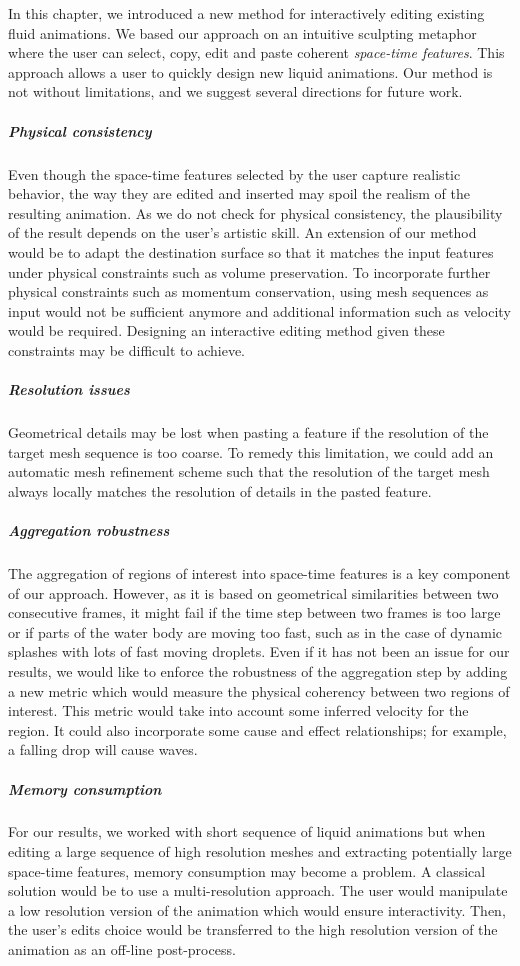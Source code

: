 In this chapter, we introduced a new method for interactively editing existing fluid animations. We based our approach on an intuitive sculpting metaphor where the user can select, copy, edit and paste coherent \emph{space-time features}. 
This approach allows a user to quickly design new liquid animations. 
Our method is not without limitations, and we suggest several directions for future work.

\subparagraph{Physical consistency} 
Even though the space-time features selected by the user capture realistic behavior, the way they are edited and inserted may spoil the realism of the resulting animation. 
As we do not check for physical consistency, the plausibility of the result depends on the user's artistic skill. 
An extension of our method would be to adapt the destination surface so that it matches the input features under physical constraints such as volume preservation. 
To incorporate further physical constraints such as momentum conservation, using mesh sequences as input would not be sufficient anymore and additional information such as velocity would be required. 
Designing an interactive editing method given these constraints may be difficult to achieve.

\subparagraph{Resolution issues} 
Geometrical details may be lost when pasting a feature if the resolution of the target mesh sequence is too coarse. 
To remedy this limitation, we could add an automatic mesh refinement scheme such that the resolution of the target mesh always locally matches the resolution of details in the pasted feature.

\subparagraph{Aggregation robustness} 
The aggregation of regions of interest into space-time features is a key component of our approach. 
However, as it is based on geometrical similarities between two consecutive frames, it might fail if the time step between two frames is too large or if parts of the water body are moving too fast, such as in the case of dynamic splashes with lots of fast moving droplets. 
Even if it has not been an issue for our results, we would like to enforce the robustness of the aggregation step by adding a new metric which would measure the physical coherency between two regions of interest. 
This metric would take into account some inferred velocity for the region. It could also incorporate some cause and effect relationships; for example, a falling drop will cause waves. 

\subparagraph{Memory consumption} 
For our results, we worked with short sequence of liquid animations but when editing a large sequence of high resolution meshes and extracting potentially large space-time features, memory consumption may become a problem. 
A classical solution would be to use a multi-resolution approach.
The user would manipulate a low resolution version of the animation which would ensure interactivity. 
Then, the user's edits choice would be transferred to the high resolution version of the animation as an off-line post-process.

